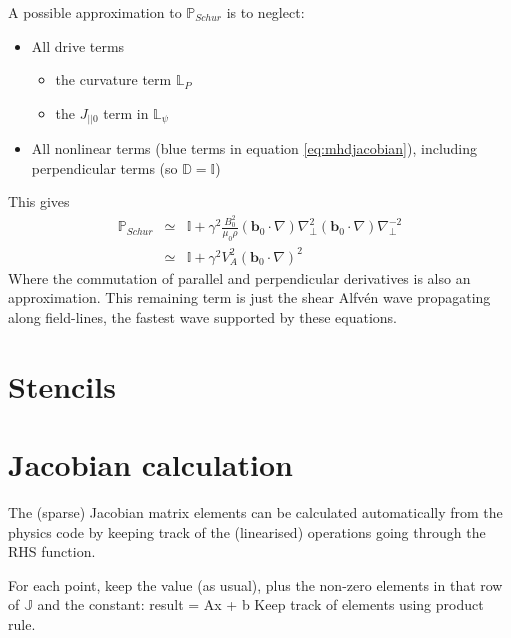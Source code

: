 \documentclass[12pt]{article}
\newcommand{\Vec}[1]{\ensuremath{\mathbf{#1}}}
\newcommand{\bvec}{\Vec{b}}
\newcommand{\delp}{\nabla_\perp^2}
\newcommand{\Jac}{\ensuremath{\mathbb{J}}}
\begin{document}
A possible approximation to $\mathbb{P}_{Schur}$ is to neglect:
\begin{itemize}
  \item All drive terms
    \begin{itemize}
    \item the curvature term $\mathbb{L}_P$
    \item the $J_{||0}$ term in $\mathbb{L}_\psi$
    \end{itemize}
  \item All nonlinear terms (blue terms in equation \ref{eq:mhdjacobian}), including perpendicular terms
    (so $\mathbb{D} = \mathbb{I}$)
\end{itemize}
This gives
\begin{eqnarray}
\mathbb{P}_{Schur} &\simeq& \mathbb{I} + \gamma^2 \frac{B_0^2}{\mu_0\rho}\left(\bvec_0\cdot\nabla\right)\delp\left(\bvec_0\cdot\nabla\right)\nabla_\perp^{-2} \nonumber \\
&\simeq& \mathbb{I} + \gamma^2 V_A^2 \left(\bvec_0\cdot\nabla\right)^2
\end{eqnarray}
Where the commutation of parallel and perpendicular derivatives is also an approximation. This
remaining term is just the shear Alfv\'en wave propagating along field-lines, the fastest wave supported by these equations.

\section{Stencils}

\section{Jacobian calculation}

The (sparse) Jacobian matrix elements can be calculated automatically
from the physics code by keeping track of the (linearised) operations
going through the RHS function.

For each point, keep the value (as usual), plus the non-zero elements in
that row of $\Jac$ and the constant: result = Ax + b
Keep track of elements using product rule.



\end{document}
